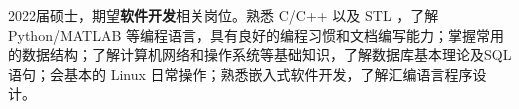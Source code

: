 {\onehalfspacing\hspace{2em}%
2022届硕士，期望\textbf{软件开发}相关岗位。熟悉 C/C++ 以及 STL ，了解 Python/MATLAB 等编程语言，具有良好的编程习惯和文档编写能力；掌握常用的数据结构；了解计算机网络和操作系统等基础知识，了解数据库基本理论及SQL语句；会基本的 Linux 日常操作；熟悉嵌入式软件开发，了解汇编语言程序设计。
\par}